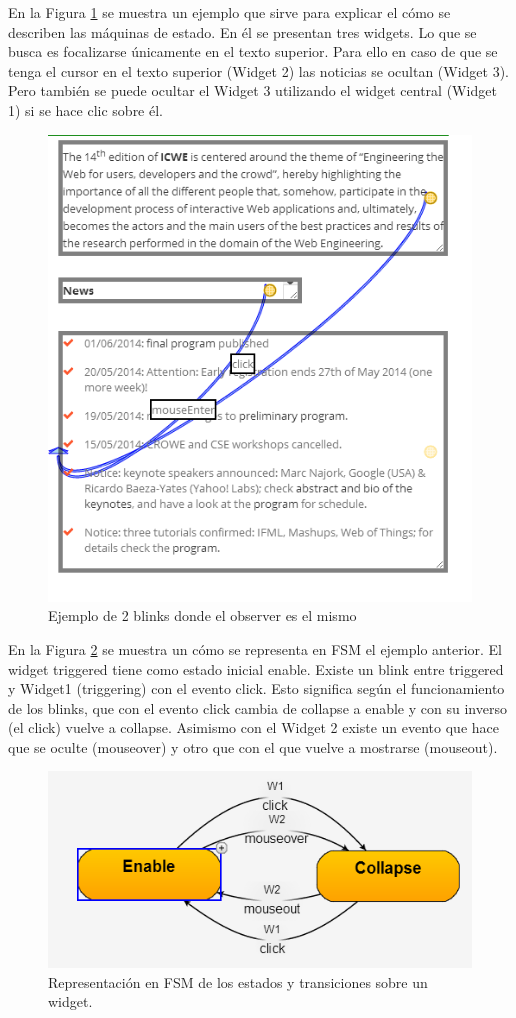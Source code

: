 En la Figura \ref{fig:blink2WidgetsExample} se muestra un ejemplo que sirve para explicar el cómo se describen las máquinas de estado. En él se presentan tres widgets. Lo que se busca es focalizarse únicamente en el texto superior. Para ello en caso de que se tenga el cursor en el texto superior (Widget 2) las noticias se ocultan (Widget 3). Pero también se puede ocultar el Widget 3 utilizando el widget central (Widget 1) si se hace clic sobre él.

\begin{figure}
\centering
\includegraphics[width=0.5\linewidth]{./figs/5-blink2WidgetsExample}
\caption{Ejemplo de 2 blinks donde el observer es el mismo}
\label{fig:blink2WidgetsExample}
\end{figure}

En la Figura \ref{fig:WidgetFSM} se muestra un cómo se representa en FSM el ejemplo anterior. El widget triggered tiene como estado inicial enable. Existe un blink entre triggered y Widget1 (triggering) con el evento click. Esto significa según el funcionamiento de los blinks, que con el evento click cambia de collapse a enable y con su inverso (el click) vuelve a collapse. Asimismo con el Widget 2 existe un evento que hace que se oculte (mouseover) y otro que con el que vuelve a mostrarse (mouseout).

\begin{figure}
\centering
\includegraphics[width=0.7\linewidth]{./figs/5-WidgetFSM}
\caption{Representación en FSM de los estados y transiciones sobre un widget.}
\label{fig:WidgetFSM}
\end{figure}

